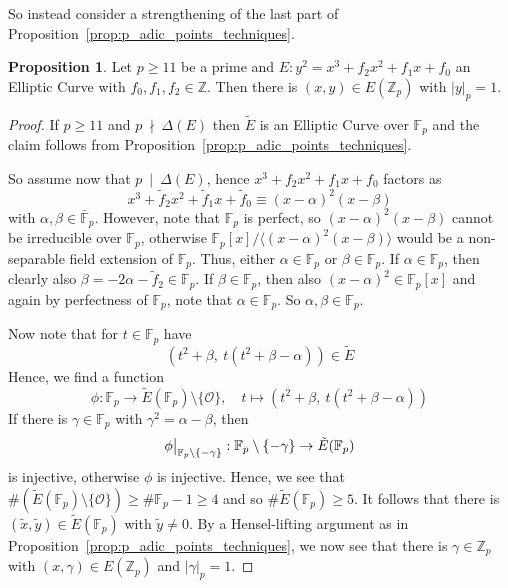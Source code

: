 \documentclass{scrartcl}
\newcommand{\Z}{\mathbb{Z}}
\newcommand{\F}{\mathbb{F}}
\renewcommand{\O}{\mathcal{O}}
\newcommand{\notdivides}{\ \nmid \ }
\newcommand{\divides}{\ \mid \ }
\newcommand\restr[2]{{
    \left.\kern-\nulldelimiterspace
    #1
    \vphantom{\big|}
    \right|_{#2}
}}
\theoremstyle{definition}
\newtheorem{prop}[subsection]{Proposition}
\begin{document}
So instead consider a strengthening of the last part of Proposition~\ref{prop:p_adic_points_techniques}.
\begin{prop}
    \label{prop:points_in_EZp}
    Let $p \geq 11$ be a prime and $E: y^2 = x^3 + f_2 x^2 + f_1 x + f_0$ an Elliptic Curve with $f_0, f_1, f_2 \in \Z$.
    Then there is $(x, y) \in E(\Z_p)$ with $|y|_p = 1$.
\end{prop}
\begin{proof}
    If $p \geq 11$ and $p \notdivides \Delta(E)$ then $\tilde{E}$ is an Elliptic Curve over $\F_p$ and the claim follows from Proposition~\ref{prop:p_adic_points_techniques}.
    
    So assume now that $p \divides \Delta(E)$, hence $x^3 + f_2 x^2 + f_1 x + f_0$ factors as
    \begin{equation*}
        x^3 + \tilde{f}_2 x^2 + \tilde{f}_1 x + \tilde{f}_0 \equiv (x - \alpha)^2(x - \beta)
    \end{equation*}
    with $\alpha, \beta \in \bar{\F}_p$.
    However, note that $\F_p$ is perfect, so $(x - \alpha)^2(x - \beta)$ cannot be irreducible over $\F_p$, otherwise $\F_p[x] / \langle(x - \alpha)^2(x - \beta)\rangle$ would be a non-separable field extension of $\F_p$.
    Thus, either $\alpha \in \F_p$ or $\beta \in \F_p$.
    If $\alpha \in \F_p$, then clearly also $\beta = -2\alpha - \tilde{f}_2 \in \F_p$.
    If $\beta \in \F_p$, then also $(x - \alpha)^2 \in \F_p[x]$ and again by perfectness of $\F_p$, note that $\alpha \in \F_p$.
    So $\alpha, \beta \in \F_p$.

    Now note that for $t \in \F_p$ have
    \begin{equation*}
        \left( t^2 + \beta, \ t (t^2 + \beta - \alpha) \right) \in \tilde{E}
    \end{equation*}
    Hence, we find a function
    \begin{equation*}
        \phi: \F_p \to \tilde{E}(\F_p) \setminus \{\O\}, \quad t \mapsto \left( t^2 + \beta, \ t (t^2 + \beta - \alpha) \right)
    \end{equation*}
    If there is $\gamma \in \F_p$ with $\gamma^2 = \alpha - \beta$, then 
    \begin{equation*}
        \restr{\phi}{\F_p \setminus \{-\gamma\}}: \F_p \setminus \{-\gamma\} \to \tilde{E}(\F_p)
    \end{equation*}
    is injective, otherwise $\phi$ is injective.
    Hence, we see that $\#(\tilde{E}(\F_p) \setminus \{\O\}) \geq \#\F_p - 1 \geq 4$ and so $\#\tilde{E}(\F_p) \geq 5$.
    It follows that there is $(\tilde{x}, \tilde{y}) \in \tilde{E}(\F_p)$ with $\tilde{y} \neq 0$.
    By a Hensel-lifting argument as in Proposition~\ref{prop:p_adic_points_techniques}, we now see that there is $\gamma \in \Z_p$ with $(x, \gamma) \in E(\Z_p)$ and $|\gamma|_p = 1$.
\end{proof}
\end{document}
